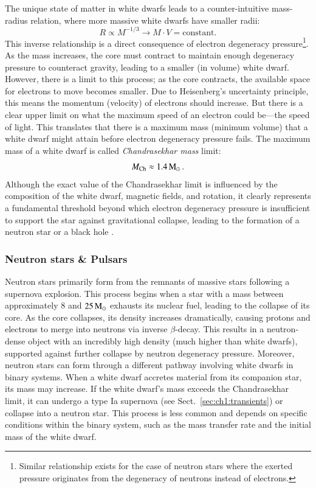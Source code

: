 \documentclass[main.tex]{subfiles}
\begin{document}
    The unique state of matter in white dwarfs leads to a counter-intuitive mass-radius relation, where more massive white dwarfs have smaller radii:
    \begin{equation}\label{eq:m-r_wd}
        R \propto M^{-1/3} \longrightarrow M\cdot V = \text{constant.}
    \end{equation}
    This inverse relationship is a direct consequence of electron degeneracy pressure\footnote{Similar relationship exists for the case of neutron stars where the exerted pressure originates from the degeneracy of neutrons instead of electrons.}. As the mass increases, the core must contract to maintain enough degeneracy pressure to counteract gravity, leading to a smaller (in volume) white dwarf. However, there is a limit to this process; as the core contracts, the available space for electrons to move becomes smaller. Due to Heisenberg's uncertainty principle, this means the momentum (velocity) of electrons should increase. But there is a clear upper limit on what the maximum speed of an electron could be---the speed of light. This translates that there is a maximum mass (minimum volume) that a white dwarf might attain before electron degeneracy pressure fails. The maximum mass of a white dwarf is called \textit{Chandrasekhar mass} limit:
    \begin{equation}\label{eq:chandra_limit}
        M_\mathrm{Ch} \approx 1.4\mathrm{\,M_\odot}\,.
    \end{equation}
    Although the exact value of the Chandrasekhar limit is influenced by the composition of the white dwarf, magnetic fields, and rotation, it clearly represents a fundamental threshold beyond which electron degeneracy pressure is insufficient to support the star against gravitational collapse, leading to the formation of a neutron star or a black hole \citep[for a more extensive overview of white dwarfs we refer to ][]{blouin2024}.

    \subsubsection{Neutron stars \& Pulsars}
    Neutron stars primarily form from the remnants of massive stars following a supernova explosion. This process begins when a star with a mass between approximately $8$ and $25\mathrm{\,M_\odot}$ exhausts its nuclear fuel, leading to the collapse of its core. As the core collapses, its density increases dramatically, causing protons and electrons to merge into neutrons via inverse $\beta$-decay. This results in a neutron-dense object with an incredibly high density (much higher than white dwarfs), supported against further collapse by neutron degeneracy pressure. 
    Moreover, neutron stars can form through a different pathway involving white dwarfs in binary systems. When a white dwarf accretes material from its companion star, its mass may increase. If the white dwarf's mass exceeds the Chandrasekhar limit, it can undergo a type Ia supernova (see Sect.~\ref{sec:ch1:transients}) or collapse into a neutron star. This process is less common and depends on specific conditions within the binary system, such as the mass transfer rate and the initial mass of the white dwarf.
\end{document}
